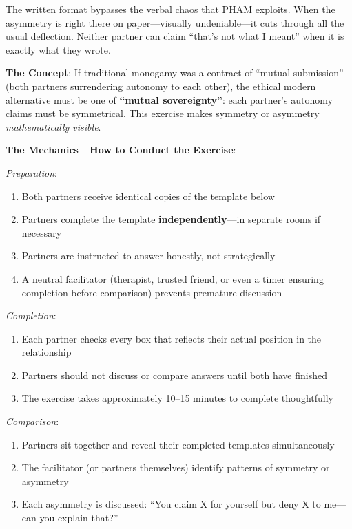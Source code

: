 \documentclass[12pt, letterpaper]{article}
\begin{document}
The written format bypasses the verbal chaos that PHAM exploits. When the asymmetry is right there on paper---visually undeniable---it cuts through all the usual deflection. Neither partner can claim ``that's not what I meant'' when it is exactly what they wrote.

\textbf{The Concept}: If traditional monogamy was a contract of ``mutual submission'' (both partners surrendering autonomy to each other), the ethical modern alternative must be one of \textbf{``mutual sovereignty''}: each partner's autonomy claims must be symmetrical. This exercise makes symmetry or asymmetry \textit{mathematically visible}.

\textbf{The Mechanics---How to Conduct the Exercise}:

\textit{Preparation}:
\begin{enumerate}
    \item Both partners receive identical copies of the template below
    \item Partners complete the template \textbf{independently}---in separate rooms if necessary
    \item Partners are instructed to answer honestly, not strategically
    \item A neutral facilitator (therapist, trusted friend, or even a timer ensuring completion before comparison) prevents premature discussion
\end{enumerate}

\textit{Completion}:
\begin{enumerate}
    \item Each partner checks every box that reflects their actual position in the relationship
    \item Partners should not discuss or compare answers until both have finished
    \item The exercise takes approximately 10--15 minutes to complete thoughtfully
\end{enumerate}

\textit{Comparison}:
\begin{enumerate}
    \item Partners sit together and reveal their completed templates simultaneously
    \item The facilitator (or partners themselves) identify patterns of symmetry or asymmetry
    \item Each asymmetry is discussed: ``You claim X for yourself but deny X to me---can you explain that?''
\end{enumerate}
\end{document}
